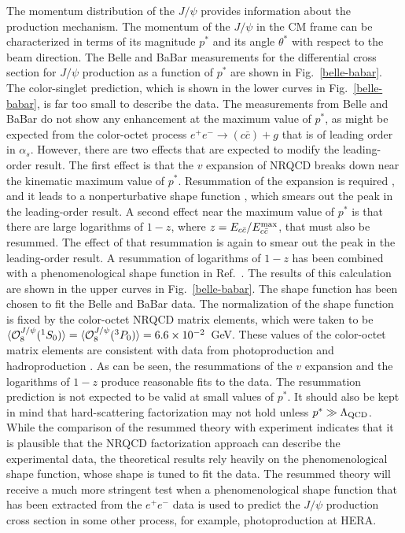 The momentum distribution of the $J/\psi$ provides information about the
production mechanism. The momentum of the $J/\psi$ in the CM frame
can be characterized in terms of its magnitude $p^*$ and its angle
$\theta^*$ with respect to the beam direction. The Belle
\cite{Abe:2001za} and BaBar \cite{Aubert:2001pd} measurements for the
differential cross section for $J/\psi$ production as a function of
$p^*$ are shown in Fig.~\ref{belle-babar}. The color-singlet prediction,
which is shown in the lower curves in Fig.~\ref{belle-babar}, is far too
small to describe the data. The measurements from Belle and BaBar do not
show any enhancement at the maximum value of $p^*$, as might be expected
from the color-octet process $e^+ e^- \to (c \bar c) + g$ that is of
leading order in $\alpha_s$. However, there are two effects that are
expected to modify the leading-order result. The first effect is that
the $v$ expansion of NRQCD breaks down near the kinematic maximum value
of $p^*$. Resummation of the expansion is required
\cite{Beneke:1997qw,Beneke:1999gq}, and it leads to a nonperturbative
shape function \cite{Beneke:1997qw}, which smears out the peak in the
leading-order result. A second effect near the maximum value of $p^*$ is
that there are large logarithms of $1-z$, where $z=E_{c\bar c}/E_{c\bar
c}^{\rm max}$, that must also be resummed. The effect of that
resummation is again to smear out the peak in the leading-order result.
A resummation of logarithms of $1-z$ has been combined with a
phenomenological shape function in Ref.~\cite{Fleming:2003gt}. The
results of this calculation are shown in the upper curves in
Fig.~\ref{belle-babar}. The shape function has been chosen to fit the
Belle and BaBar data. The normalization of the shape function is fixed
by the color-octet NRQCD matrix elements, which were taken to be
$\langle{\cal O}^{J/\psi}_8({}^1S_0)\rangle= \langle{\cal
O}^{J/\psi}_8({}^3P_0)\rangle=6.6\times10^{-2}$~GeV.  These values of
the color-octet matrix elements are consistent with data from
photoproduction and hadroproduction
\cite{Beneke:1996tk,Amundson:1996ik}. As can be seen, the resummations of
the $v$ expansion and the logarithms of $1-z$ produce reasonable fits to
the data. The resummation prediction is not expected to be valid at
small values of $p^*$. It should also be kept in
mind that hard-scattering factorization may not hold unless
$p^*\gg\Lambda_{\rm QCD}$. While the comparison of the resummed theory
with experiment indicates that it is plausible that the NRQCD
factorization approach can describe the experimental data, the
theoretical results rely heavily on the phenomenological shape function,
whose shape is tuned to fit the data. The resummed theory will receive a
much more stringent test when a phenomenological shape function that has
been extracted from the $e^+e^-$ data is used to predict the $J/\psi$
production cross section in some other process, for example,
photoproduction at HERA.

